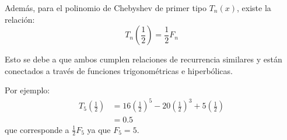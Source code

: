 Además, para el polinomio de Chebyshev de primer tipo $T_n(x)$, existe la relación:
\begin{equation*}
T_n\left(\frac{1}{2}\right) = \frac{1}{2} F_n
\end{equation*}

Esto se debe a que ambos cumplen relaciones de recurrencia similares y están conectados a través de funciones trigonométricas e hiperbólicas.

Por ejemplo:
\begin{align*}
T_5\left(\frac{1}{2}\right) &= 16\left(\frac{1}{2}\right)^5 - 20\left(\frac{1}{2}\right)^3 + 5\left(\frac{1}{2}\right) \\
&= 0.5
\end{align*}
que corresponde a $\frac{1}{2} F_5$ ya que $F_5 = 5$.
